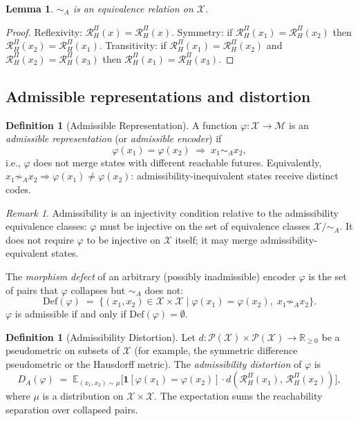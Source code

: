 \documentclass[11pt, a4paper]{article}
\theoremstyle{plain}
\newtheorem{lemma}[theorem]{Lemma}
\theoremstyle{definition}
\newtheorem{definition}[theorem]{Definition}
\theoremstyle{remark}
\newtheorem{remark}[theorem]{Remark}
\newcommand{\E}{\mathbb{E}}
\newcommand{\R}{\mathbb{R}}
\newcommand{\calX}{\mathcal{X}}
\newcommand{\calM}{\mathcal{M}}
\newcommand{\calP}{\mathcal{P}}
\newcommand{\simA}{\sim_{\!A}}
\newcommand{\RHP}{\mathcal{R}_{H}^{\Pi}}
\newcommand{\DA}{D_{A}(\varphi)}
\newcommand{\XmodA}{\calX/{\simA}}
\newcommand{\Def}{\mathrm{Def}}
\begin{document}
\begin{lemma}
$\simA$ is an equivalence relation on $\calX$.
\end{lemma}

\begin{proof}
Reflexivity: $\RHP(x) = \RHP(x)$. Symmetry: if $\RHP(x_1) = \RHP(x_2)$
then $\RHP(x_2) = \RHP(x_1)$. Transitivity: if $\RHP(x_1) = \RHP(x_2)$
and $\RHP(x_2) = \RHP(x_3)$ then $\RHP(x_1) = \RHP(x_3)$.
\end{proof}

\subsection{Admissible representations and distortion}

\begin{definition}[Admissible Representation]
\label{def:admissible_rep}
A function $\varphi\colon \calX \to \calM$ is an \emph{admissible
representation} (or \emph{admissible encoder}) if
\[
  \varphi(x_1) = \varphi(x_2) \;\Longrightarrow\; x_1 \simA x_2,
\]
i.e., $\varphi$ does not merge states with different reachable futures.
Equivalently, $x_1 \not\simA x_2 \Rightarrow \varphi(x_1) \neq \varphi(x_2)$:
admissibility-inequivalent states receive distinct codes.
\end{definition}

\begin{remark}
Admissibility is an injectivity condition relative to the admissibility
equivalence classes: $\varphi$ must be injective on the set of equivalence
classes $\XmodA$. It does not require $\varphi$ to be injective on $\calX$
itself; it may merge admissibility-equivalent states.
\end{remark}

The \emph{morphism defect} of an arbitrary (possibly inadmissible) encoder
$\varphi$ is the set of pairs that $\varphi$ collapses but $\simA$ does not:
\[
  \Def(\varphi) \;=\;
  \bigl\{(x_1, x_2) \in \calX \times \calX \;\big|\;
    \varphi(x_1) = \varphi(x_2),\; x_1 \not\simA x_2\bigr\}.
\]
$\varphi$ is admissible if and only if $\Def(\varphi) = \emptyset$.

\begin{definition}[Admissibility Distortion]
\label{def:distortion}
Let $d\colon \calP(\calX) \times \calP(\calX) \to \R_{\geq 0}$ be a
pseudometric on subsets of $\calX$ (for example, the symmetric difference
pseudometric or the Hausdorff metric). The \emph{admissibility distortion}
of $\varphi$ is
\[
  \DA \;=\;
  \E_{(x_1, x_2) \sim \mu}\!\bigl[
    \mathbf{1}[\varphi(x_1) = \varphi(x_2)] \cdot
    d(\RHP(x_1),\, \RHP(x_2))
  \bigr],
\]
where $\mu$ is a distribution on $\calX \times \calX$. The expectation sums
the reachability separation over collapsed pairs.
\end{definition}
\end{document}
